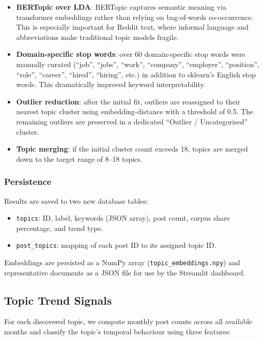 \documentclass[11pt,a4paper]{article}
\begin{document}
\begin{itemize}[leftmargin=*]
  \item \textbf{BERTopic over LDA}: BERTopic captures semantic meaning via transformer embeddings rather than relying on bag-of-words co-occurrence. This is especially important for Reddit text, where informal language and abbreviations make traditional topic models fragile.
  \item \textbf{Domain-specific stop words}: over 60 domain-specific stop words were manually curated (``job'', ``jobs'', ``work'', ``company'', ``employer'', ``position'', ``role'', ``career'', ``hired'', ``hiring'', etc.) in addition to sklearn's English stop words. This dramatically improved keyword interpretability.
  \item \textbf{Outlier reduction}: after the initial fit, outliers are reassigned to their nearest topic cluster using embedding-distance with a threshold of 0.5. The remaining outliers are preserved in a dedicated ``Outlier / Uncategorised'' cluster.
  \item \textbf{Topic merging}: if the initial cluster count exceeds 18, topics are merged down to the target range of 8--18 topics.
\end{itemize}

\subsubsection{Persistence}

Results are saved to two new database tables:
\begin{itemize}[leftmargin=*]
  \item \texttt{topics}: ID, label, keywords (JSON array), post count, corpus share percentage, and trend type.
  \item \texttt{post\_topics}: mapping of each post ID to its assigned topic ID.
\end{itemize}

Embeddings are persisted as a NumPy array (\texttt{topic\_embeddings.npy}) and representative documents as a JSON file for use by the Streamlit dashboard.


\subsection{Topic Trend Signals}
\label{sec:trending}

For each discovered topic, we compute monthly post counts across all available months and classify the topic's temporal behaviour using three features:
\end{document}
